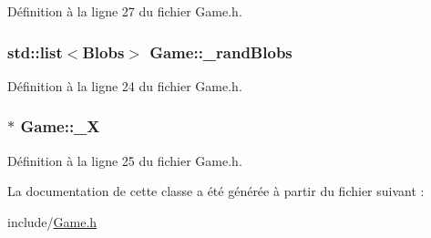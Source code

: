 Définition à la ligne 27 du fichier Game.h.

\hypertarget{a00008_a33bcc74459901d064c807acff9c9526a}{
\subsubsection[{\_\-randBlobs}]{\setlength{\rightskip}{0pt plus 5cm}std::list$<${\bf Blobs}$>$ {\bf Game::\_\-randBlobs}}}
\label{a00008_a33bcc74459901d064c807acff9c9526a}


Définition à la ligne 24 du fichier Game.h.

\hypertarget{a00008_aa1772649a588646ef4e1a131e94d05b1}{
\subsubsection[{\_\-X}]{$\ast$ {\bf Game::\_\-X}}}
\label{a00008_aa1772649a588646ef4e1a131e94d05b1}


Définition à la ligne 25 du fichier Game.h.



La documentation de cette classe a été générée à partir du fichier suivant :\begin{DoxyCompactItemize}
\item 
include/\hyperlink{a00025}{Game.h}\end{DoxyCompactItemize}

